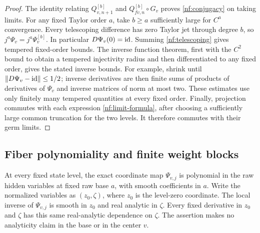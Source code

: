 \begin{proof}
The identity relating $Q_{v,n+1}^{[b]}$ and
$Q_{fv,n}^{[b]}\circ G_v$ proves \eqref{nf:conjugacy} on taking
limits.  For any fixed Taylor order $a$, take $b\geq a$ sufficiently
large for $C^a$ convergence.  Every telescoping difference has
zero Taylor jet through degree $b$, so $j^a\Psi_v=j^a\Psi_v^{[b]}$.
In particular $D\Psi_v(0)=\mathrm{id}$.  Summing
\eqref{nf:telescoping} gives tempered fixed-order bounds.
The inverse function theorem, first with the $C^2$ bound to obtain
a tempered injectivity radius and then differentiated to any fixed
order, gives the stated inverse bounds.  For example, shrink until
$\|D\Psi_v-\mathrm{id}\|\leq1/2$; inverse derivatives are then finite sums
of products of derivatives of $\Psi_v$ and inverse matrices of norm
at most two.  These estimates use only finitely many tempered
quantities at every fixed order.  Finally, projection commutes with
each expression \eqref{nf:limit-formula}, after choosing a sufficiently
large common truncation for the two levels.  It therefore commutes
with their germ limits.
\end{proof}

\subsection{Fiber polynomiality and finite weight blocks}

\begin{lemma}
\label{nf:fiber-analyticity}
At every fixed state level, the exact coordinate map $\Psi_{v,j}$
is polynomial in the raw hidden variables at fixed raw base $a$,
with smooth coefficients in $a$.  Write the normalized variables
as $(z_0,\zeta)$, where $z_0$ is the level-zero coordinate.  The
local inverse of $\Psi_{v,j}$ is smooth in $z_0$ and real analytic
in $\zeta$.  Every fixed derivative in $z_0$ and $\zeta$ has this
same real-analytic dependence on $\zeta$.  The assertion makes no
analyticity claim in the base or in the center $v$.
\end{lemma}

